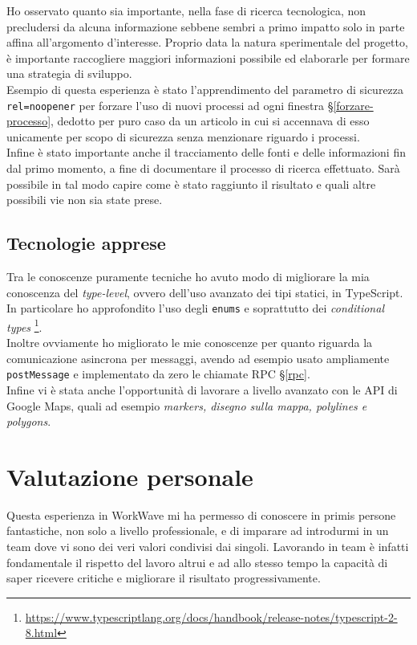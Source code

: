 Ho osservato quanto sia importante, nella fase di ricerca tecnologica, non precludersi da alcuna informazione sebbene sembri a primo impatto solo in parte affina all'argomento d'interesse. Proprio data la natura sperimentale del progetto, è importante raccogliere maggiori informazioni possibile ed elaborarle per formare una strategia di sviluppo. \\

Esempio di questa esperienza è stato l'apprendimento del parametro di sicurezza \texttt{rel=noopener} per forzare l'uso di nuovi processi ad ogni finestra §\ref{forzare-processo}, dedotto per puro caso da un articolo in cui si accennava di esso unicamente per scopo di sicurezza senza menzionare riguardo i processi. \\

Infine è stato importante anche il tracciamento delle fonti e delle informazioni fin dal primo momento, a fine di documentare il processo di ricerca effettuato. Sarà possibile in tal modo capire come è stato raggiunto il risultato e quali altre possibili vie non sia state prese.

\subsection{Tecnologie apprese}

Tra le conoscenze puramente tecniche ho avuto modo di migliorare la mia conoscenza del \textit{type-level}, ovvero dell'uso avanzato dei tipi statici, in TypeScript. In particolare ho approfondito l'uso degli \texttt{enums} e soprattutto dei \textit{conditional types} \footnote{\url{https://www.typescriptlang.org/docs/handbook/release-notes/typescript-2-8.html}}. \\

Inoltre ovviamente ho migliorato le mie conoscenze per quanto riguarda la comunicazione asincrona per messaggi, avendo ad esempio usato ampliamente \texttt{postMessage} e implementato da zero le chiamate RPC §\ref{rpc}. \\

Infine vi è stata anche l'opportunità di lavorare a livello avanzato con le API di Google Maps, quali ad esempio \textit{markers, disegno sulla mappa, polylines e polygons}.

\section{Valutazione personale}

Questa esperienza in WorkWave mi ha permesso di conoscere in primis persone fantastiche, non solo a livello professionale, e di imparare ad introdurmi in un team dove vi sono dei veri valori condivisi dai singoli. Lavorando in team è infatti fondamentale il rispetto del lavoro altrui e ad allo stesso tempo la capacità di saper ricevere critiche e migliorare il risultato progressivamente.

